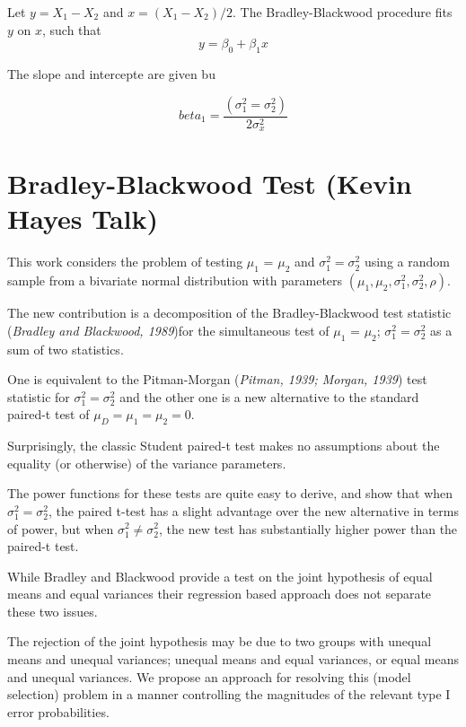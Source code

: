 \documentclass[12pt, a4paper]{report}
\theoremstyle{plain}
\theoremstyle{definition}
\theoremstyle{remark}
\begin{document}
Let $y = X_1 - X_2$ and $x= (X_1 - X_2)/2$.
The Bradley-Blackwood procedure fits $y$ on $x$, such that
\[ y = \beta_0 + \beta_1x \]

The slope and intercepte are given bu

\[beta_1 =  \frac{(\sigma^2_1 = \sigma^2_2)}{2\sigma^2_x}\]


	\section{Bradley-Blackwood Test (Kevin Hayes Talk)}
	
	This work considers the problem of testing $\mu_1$ = $\mu_2$ and $\sigma^2_1 = \sigma^2_2$ using a random sample from a bivariate normal distribution with parameters $(\mu_1, \mu_2, \sigma^2_1, \sigma^2_2, \rho)$. 
	
	The new contribution is a decomposition of the Bradley-Blackwood test statistic (\textit{Bradley and Blackwood, 1989})for the simultaneous test of {$\mu_1$ = $\mu_2$; $\sigma^2_1 = \sigma^2_2$}  as a sum of two statistics. 
	
	One is equivalent to the Pitman-Morgan (\textit{Pitman, 1939; Morgan, 1939}) test statistic 
	for $\sigma^2_1 = \sigma^2_2$ and the other one is a new alternative to the standard paired-t test of $\mu_D = \mu_1 = \mu_2 = 0$. 
	
	Surprisingly, the classic Student paired-t test makes no assumptions about the equality (or otherwise) of the 
	variance parameters. 
	
	The power functions for these tests are quite easy to derive, and show that when $\sigma^2_1 = \sigma^2_2$, 
	the paired t-test has a slight advantage over the new alternative in terms of power, but when $\sigma^2_1 \neq \sigma^2_2$, the 
	new test has substantially higher power than the paired-t test.
	
	While Bradley and Blackwood provide a test on the joint hypothesis of equal means and equal variances their regression based approach does not separate these two issues.
	
	The rejection of the joint hypothesis may be 
	due to two groups with unequal means and unequal variances; unequal means and equal variances, or equal means and unequal variances. We propose an approach for resolving this (model selection) problem in a manner controlling the magnitudes of the relevant type I error probabilities.
	
\end{document}
